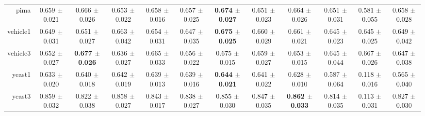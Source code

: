 \begin{table}[!ht]
{\begin{tabular}{r c c c c c c c c c c c}
pima & 0.659 $\pm$ 0.021 & 0.666 $\pm$ 0.026 & 0.653 $\pm$ 0.022 & 0.658 $\pm$ 0.016 & 0.657 $\pm$ 0.025 & \textbf{0.674 $\pm$ 0.027} & 0.651 $\pm$ 0.023 & 0.664 $\pm$ 0.026 & 0.651 $\pm$ 0.031 & 0.581 $\pm$ 0.055 & 0.658 $\pm$ 0.028 \\
vehicle1 & 0.649 $\pm$ 0.031 & 0.651 $\pm$ 0.027 & 0.663 $\pm$ 0.042 & 0.654 $\pm$ 0.031 & 0.647 $\pm$ 0.035 & \textbf{0.675 $\pm$ 0.025} & 0.660 $\pm$ 0.029 & 0.661 $\pm$ 0.021 & 0.645 $\pm$ 0.023 & 0.645 $\pm$ 0.025 & 0.649 $\pm$ 0.042 \\
vehicle3 & 0.652 $\pm$ 0.027 & \textbf{0.677 $\pm$ 0.026} & 0.636 $\pm$ 0.027 & 0.665 $\pm$ 0.033 & 0.656 $\pm$ 0.022 & 0.675 $\pm$ 0.015 & 0.659 $\pm$ 0.027 & 0.653 $\pm$ 0.015 & 0.645 $\pm$ 0.044 & 0.667 $\pm$ 0.026 & 0.647 $\pm$ 0.038 \\
yeast1 & 0.633 $\pm$ 0.020 & 0.640 $\pm$ 0.018 & 0.642 $\pm$ 0.019 & 0.639 $\pm$ 0.013 & 0.639 $\pm$ 0.016 & \textbf{0.644 $\pm$ 0.021} & 0.641 $\pm$ 0.022 & 0.628 $\pm$ 0.010 & 0.587 $\pm$ 0.064 & 0.118 $\pm$ 0.016 & 0.565 $\pm$ 0.040 \\
yeast3 & 0.859 $\pm$ 0.032 & 0.822 $\pm$ 0.038 & 0.858 $\pm$ 0.027 & 0.843 $\pm$ 0.017 & 0.838 $\pm$ 0.027 & 0.855 $\pm$ 0.030 & 0.847 $\pm$ 0.035 & \textbf{0.862 $\pm$ 0.033} & 0.814 $\pm$ 0.035 & 0.113 $\pm$ 0.031 & 0.827 $\pm$ 0.030 \\
\end{tabular}}
\end{table}
